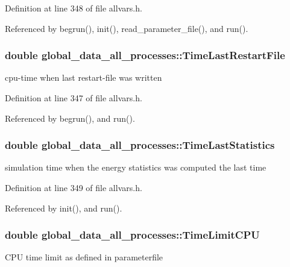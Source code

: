 Definition at line 348 of file allvars.h.



Referenced by begrun(), init(), read\_\-parameter\_\-file(), and run().

\hypertarget{structglobal__data__all__processes_a1042ebf3c648c2b23dca6fc65ff22785}{
\subsubsection[{TimeLastRestartFile}]{\setlength{\rightskip}{0pt plus 5cm}double {\bf global\_\-data\_\-all\_\-processes::TimeLastRestartFile}}}
\label{structglobal__data__all__processes_a1042ebf3c648c2b23dca6fc65ff22785}
cpu-\/time when last restart-\/file was written 

Definition at line 347 of file allvars.h.



Referenced by begrun(), and run().

\hypertarget{structglobal__data__all__processes_ab088f20e7889a88f2e0f652df4781e44}{
\subsubsection[{TimeLastStatistics}]{\setlength{\rightskip}{0pt plus 5cm}double {\bf global\_\-data\_\-all\_\-processes::TimeLastStatistics}}}
\label{structglobal__data__all__processes_ab088f20e7889a88f2e0f652df4781e44}
simulation time when the energy statistics was computed the last time 

Definition at line 349 of file allvars.h.



Referenced by init(), and run().

\hypertarget{structglobal__data__all__processes_accf0e0ec1acab3f51f583470910049d2}{
\subsubsection[{TimeLimitCPU}]{\setlength{\rightskip}{0pt plus 5cm}double {\bf global\_\-data\_\-all\_\-processes::TimeLimitCPU}}}
\label{structglobal__data__all__processes_accf0e0ec1acab3f51f583470910049d2}
CPU time limit as defined in parameterfile 

